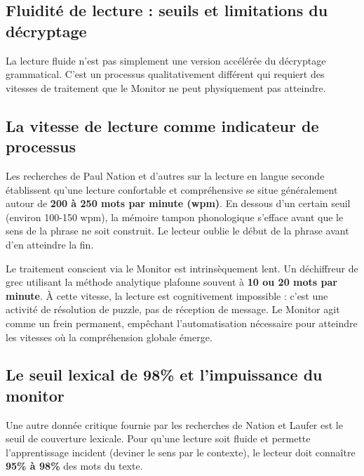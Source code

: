 \subsection{Fluidité de lecture : seuils et limitations du décryptage}

La lecture fluide n'est pas simplement une version accélérée du décryptage grammatical. C'est un
processus qualitativement différent qui requiert des vitesses de traitement que le Monitor ne peut
physiquement pas atteindre.



\subsection{La vitesse de lecture comme indicateur de processus}

Les recherches de Paul Nation et d'autres sur la lecture en langue seconde établissent qu'une
lecture confortable et compréhensive se situe généralement autour de \textbf{200 à 250 mots par
minute (wpm)}. En dessous d'un certain seuil (environ 100-150 wpm), la mémoire tampon phonologique
s'efface avant que le sens de la phrase ne soit construit. Le lecteur oublie le début de la phrase
avant d'en atteindre la fin.\cite{II-2-3-ref32}

Le traitement conscient via le Monitor est intrinsèquement lent. Un \og déchiffreur\fg{} de grec
utilisant la méthode analytique plafonne souvent à \textbf{10 ou 20 mots par minute}. À cette
vitesse, la lecture est cognitivement impossible : c'est une activité de résolution de puzzle, pas
de réception de message. Le Monitor agit comme un frein permanent, empêchant l'automatisation
nécessaire pour atteindre les vitesses où la compréhension globale émerge.\cite{II-2-3-ref34}



\subsection{Le seuil lexical de 98\% et l'impuissance du monitor}

Une autre donnée critique fournie par les recherches de Nation et Laufer est le seuil de couverture
lexicale. Pour qu'une lecture soit fluide et permette l'apprentissage incident (deviner le sens par
le contexte), le lecteur doit connaître \textbf{95\% à 98\%} des mots du texte.\cite{II-2-3-ref35}

